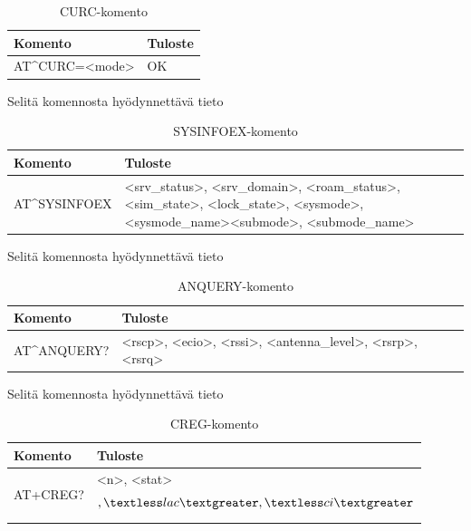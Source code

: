 \documentclass[11pt,a4paper,oneside,article,finnish]{memoir}
\begin{document}
\begin{table}[H]
	\centering
	\caption{CURC-komento}
	\begin{tabularx}{.95\textwidth}{|p{3.5cm}|X|}
		\hline
		Komento & Tuloste \\
    		\hline
		AT\^{}CURC=<mode> & OK \\
		\hline
	\end{tabularx}
	\label{table:atkomento_curc}
\end{table}
Selitä komennosta hyödynnettävä tieto
\begin{table}[H]
	\centering
	\caption{SYSINFOEX-komento}
	\begin{tabularx}{.95\textwidth}{|p{3.5cm}|X|}
		\hline
		Komento & Tuloste \\
    		\hline
		AT\^{}SYSINFOEX & \textless srv\_status\textgreater , \textless srv\_domain\textgreater , \textless roam\_status\textgreater , \textless sim\_state\textgreater , \textless lock\_state\textgreater , \textless sysmode\textgreater , \textless sysmode\_name\textgreater \textless submode\textgreater , \textless submode\_name\textgreater \\
		\hline
	\end{tabularx}
	\label{table:atkomento_sysinfoex}
\end{table}
Selitä komennosta hyödynnettävä tieto
\begin{table}[H]
	\centering
	\caption{ANQUERY-komento}
	\begin{tabularx}{.95\textwidth}{|p{3cm}|X|}
		\hline
		Komento & Tuloste \\
    		\hline
		AT\^{}ANQUERY? & \textless rscp\textgreater , \textless ecio\textgreater , \textless rssi\textgreater , \textless antenna\_level\textgreater , \textless rsrp\textgreater , \textless rsrq\textgreater \\
		\hline
	\end{tabularx}
	\label{table:atkomento_anquery}
\end{table}
Selitä komennosta hyödynnettävä tieto
\begin{table}[H]
	\centering
	\caption{CREG-komento}
	\begin{tabularx}{.95\textwidth}{|p{3cm}|X|}
		\hline
		Komento & Tuloste \\
    		\hline
		AT+CREG? & \textless n\textgreater , \textless stat\textgreater \[ , \textless lac\textgreater , \textless ci\textgreater \] \\
		\hline
	\end{tabularx}
	\label{table:atkomento_creg}
\end{table}
\end{document}
